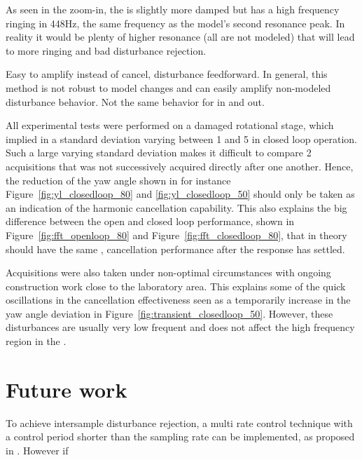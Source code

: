 As seen in the zoom-in, the \abbrIRC is slightly more damped but has a high frequency ringing in 448Hz, the same frequency as the model's second resonance peak. In reality it would be plenty of  higher resonance (all are not modeled) that will lead to more ringing and bad disturbance rejection.

Easy to amplify instead of cancel, disturbance feedforward. In general, this method is not robust to model changes and can easily amplify non-modeled disturbance behavior. Not the same behavior for in and out.


All experimental tests were performed on a damaged rotational stage, which implied in a standard deviation varying between \unit{1}{\micro\radian} and \unit{5}{\micro\radian} in closed loop operation. Such a large varying standard deviation makes it difficult to compare 2 acquisitions that was not successively acquired directly after one another. Hence, the reduction of the yaw angle shown in for instance Figure~\ref{fig:yl_closedloop_80} and \ref{fig:yl_closedloop_50} should only be taken as an indication of the harmonic cancellation capability. This also explains the big difference between the open and closed loop performance, shown in Figure~\ref{fig:fft_openloop_80} and Figure~\ref{fig:fft_closedloop_80}, that in theory should have the same , cancellation performance after the response has settled.

Acquisitions were also taken under non-optimal circumstances with ongoing construction work close to the laboratory area. This explains some of the quick oscillations in the cancellation effectiveness seen as a temporarily increase in the yaw angle deviation in Figure~\ref{fig:transient_closedloop_50}. However, these disturbances are usually very low frequent and does not affect the high frequency region in the \abbrFFT.



\section{Future work}

To achieve intersample disturbance rejection, a multi rate control technique with a control period shorter than the sampling rate can be implemented, as proposed in \citep{fujimoto2009rro}. However if
